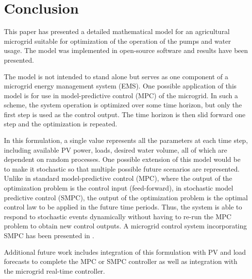 \section{Conclusion}
\label{sec:conclusion}

This paper has presented a detailed mathematical model for an agricultural microgrid suitable for optimization of the operation of the pumps and water usage. The model was implemented in open-source software and results have been presented.

The model is not intended to stand alone but serves as one component of a microgrid energy management system (EMS).
One possible application of this model is for use in model-predictive control (MPC) of the microgrid.
In such a scheme, the system operation is optimized over some time horizon, but only the first step is used as the control output.
The time horizon is then slid forward one step and the optimization is repeated.

In this formulation, a single value represents all the parameters at each time step, including available PV power, loads, desired water volume, all of which are dependent on random processes.
One possible extension of this model would be to make it stochastic so that multiple possible future scenarios are represented.
Unlike in standard model-predictive control (MPC), where the output of the optimization problem is the control input (feed-forward), in stochastic model predictive control (SMPC), the output of the optimization problem is the optimal control law to be applied in the future time periods\cite{mesbah2016}. Thus, the system is able to respond to stochastic events dynamically without having to re-run the MPC problem to obtain new control outputs.
A microgrid control system incorporating SMPC has been presented in \cite{cominesi2015}.

Additional future work includes integration of this formulation with PV and load forecasts to complete the MPC or SMPC controller as well as integration with the microgrid real-time controller.